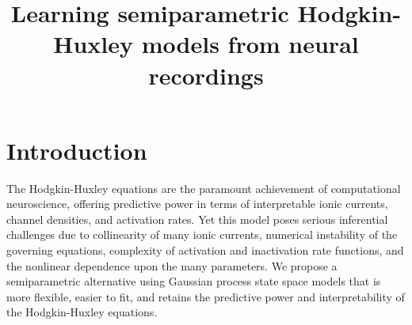 \documentclass[aos]{imsart} %
\begin{document}
\begin{frontmatter}
\title{Learning semiparametric Hodgkin-Huxley models from neural recordings} 

\end{frontmatter}

\section{Introduction} 
The Hodgkin-Huxley equations are the paramount achievement of computational neuroscience, offering predictive power in terms of interpretable ionic currents, channel densities, and activation rates. Yet this model poses serious inferential challenges due to collinearity of many ionic currents, numerical instability of the governing equations, complexity of activation and inactivation rate functions, and the nonlinear dependence upon the many parameters. We propose a semiparametric alternative using Gaussian process state space models that is more flexible, easier to fit, and retains the predictive power and interpretability of the Hodgkin-Huxley equations.
\end{document}
